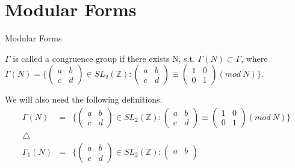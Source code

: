\documentclass{beamer}
\theoremstyle{plain}
\theoremstyle{definition}
\theoremstyle{remark}
\newcommand{\Z}{\mathbb{Z}}
\begin{document}
\section{Modular Forms}
\begin{frame}{Modular Forms}
    \begin{definition}
        $\Gamma$ is called a congruence group if there exists N, s.t. $\Gamma(N) \subset \Gamma$,
        where $\Gamma(N)=\{ \begin{pmatrix}
                a & b \\
                c & d
            \end{pmatrix} \in SL_2(\Z):\begin{pmatrix}
                a & b \\
                c & d
            \end{pmatrix} \equiv \begin{pmatrix}
                1 & 0 \\
                0 & 1
            \end{pmatrix} (mod \ N) \}$.
    \end{definition}
    We will also need the following definitions.
    \[\begin{matrix}
            \Gamma(N)      & = & \{\begin{pmatrix}
                a & b \\
                c & d
            \end{pmatrix}\in SL_2(\Z): \begin{pmatrix}
                a & b \\
                c & d
            \end{pmatrix} \equiv \begin{pmatrix}
                1 & 0 \\
                0 & 1
            \end{pmatrix} (mod \ N) \}   \\
            \bigtriangleup &   &                                                                                                                       \\
            \Gamma_1(N)    & = & \{\begin{pmatrix}
                a & b \\
                c & d
            \end{pmatrix}\in SL_2(\Z): \begin{pmatrix}
                a & b \\

\end{pmatrix}
\end{matrix}\]
\end{frame}
\end{document}

